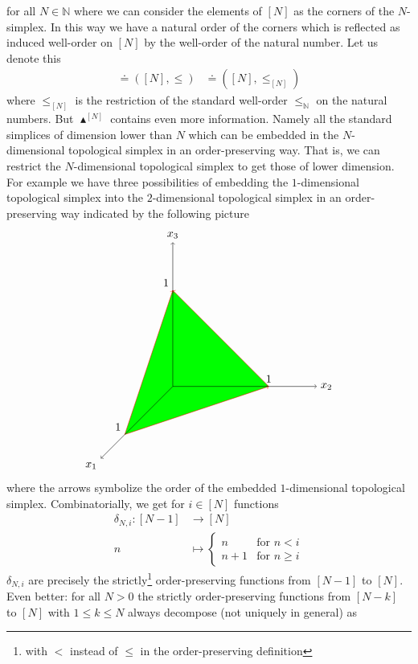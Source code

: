 for all $N \in \mathbb{N}$ where we can consider the elements of $[N]$ as the corners of the $N$-simplex. In this way we have a natural order of the corners which is reflected as induced well-order on $[N]$ by the well-order of the natural number. Let us denote this
\begin{align*}
  [N]
  \doteq
  ([N],\leq)
  &\doteq
  ([N],\leq_{[N]})
\end{align*}
where $\leq_{[N]}$ is the restriction of the standard well-order $\leq_{\mathbb{N}}$ on the natural numbers. But $\blacktriangle^{[N]}$ contains even more information. Namely all the standard simplices of dimension lower than $N$ which can be embedded in the $N$-dimensional topological simplex in an order-preserving way. That is, we can restrict the $N$-dimensional topological simplex to get those of lower dimension. For example we have three possibilities of embedding the $1$-dimensional topological simplex into the $2$-dimensional topological simplex in an order-preserving way indicated by the following picture
\[
\begin{tikzpicture}[scale=0.75]
  \fill[fill=green]
    (-2,-2) node[above left] {$1$}
    --
    (4,0) node[above] {$1$}
    --
    (0,4) node[above left] {$1$}
    --
    cycle;
  \draw[->,red]
    (-2,-2)
    --
    (4,0);
  \draw[->,red]
    (-2,-2)
    --
    (0,4);
  \draw[->,red]
    (4,0)
    --
    (0,4);
  \draw[->]
    (0,0)
    --
    (-3,-3) node[below left] {$x_{1}$};
  \draw[->]
    (0,0)
    --
    (6,0) node[right] {$x_{2}$};
  \draw[->]
    (0,0)
    --
    (0,6) node[above] {$x_{3}$};
\end{tikzpicture}
\]
where the arrows symbolize the order of the embedded $1$-dimensional topological simplex. Combinatorially, we get for $i \in [N]$ functions
\begin{align*}
  \delta_{N,i}
  \colon
  [N-1]
  &\rightarrow
  [N]
  \\
  n
  &\mapsto
  \begin{cases}
    n
    &
    \text{for }
    n
    <
    i
    \\
    n
    +
    1
    &
    \text{for }
    n
    \geq
    i
  \end{cases}
\end{align*}
$\delta_{N,i}$ are precisely the strictly\footnote{with $<$ instead of $\leq$ in the order-preserving definition} order-preserving functions from $[N-1]$ to $[N]$. Even better: for all $N > 0$ the strictly order-preserving functions from $[N-k]$ to $[N]$ with $1 \leq k \leq N$ always decompose (not uniquely in general) as
